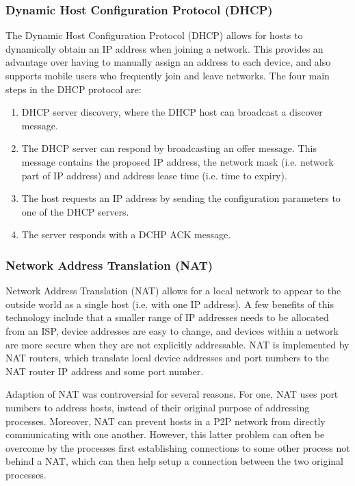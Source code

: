 \documentclass[12pt,titlepage]{article}
\begin{document}
      \subsubsection{Dynamic Host Configuration Protocol (DHCP)}
        The Dynamic Host Configuration Protocol (DHCP) allows for hosts to dynamically obtain an IP address when joining a network. This provides an
        advantage over having to manually assign an address to each device, and also supports mobile users who frequently join and leave networks.
        The four main steps in the DHCP protocol are:
        \begin{enumerate}
          \item DHCP server discovery, where the DHCP host can broadcast a discover message.
          \item The DHCP server can respond by broadcasting an offer message. This message contains the proposed IP address, the network mask
          (i.e. network part of IP address) and address lease time (i.e. time to expiry).
          \item The host requests an IP address by sending the configuration parameters to one of the DHCP servers.
          \item The server responds with a DCHP ACK message.
        \end{enumerate}

      \subsubsection{Network Address Translation (NAT)}
        Network Address Translation (NAT) allows for a local network to appear to the outside world as a single host (i.e. with one IP address).
        A few benefits of this technology include that a smaller range of IP addresses needs to be allocated from an ISP, device addresses are easy
        to change, and devices within a network are more secure when they are not explicitly addressable. NAT is implemented by NAT routers, which
        translate local device addresses and port numbers to the NAT router IP address and some port number.

        Adaption of NAT was controversial for several reasons. For one, NAT uses port numbers to address hosts, instead of their original purpose of
        addressing processes. Moreover, NAT can prevent hosts in a P2P network from directly communicating with one another. However, this latter
        problem can often be overcome by the processes first establishing connections to some other process not behind a NAT, which can then help setup
        a connection between the two original processes.
\end{document}
